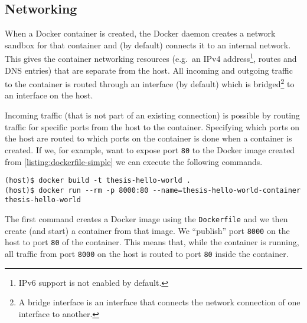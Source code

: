 \subsection{Networking}
When a Docker container is created, the Docker daemon creates a network sandbox for that container and (by default) connects it to an internal network. This gives the container networking resources (e.g.\ an IPv4 address\footnote{IPv6 support is not enabled by default.}, routes and DNS entries) that are separate from the host. All incoming and outgoing traffic to the container is routed through an interface (by default) which is bridged\footnote{A bridge interface is an interface that connects the network connection of one interface to another.} to an interface on the host.

\medskip

Incoming traffic (that is not part of an existing connection) is possible by routing traffic for specific ports from the host to the container.
Specifying which ports on the host are routed to which ports on the container is done when a container is created. If we, for example, want to expose port \lstinline{80} to the Docker image created from \autoref{listing:dockerfile-simple} we can execute the following commands.

\begin{lstlisting}[caption={Creating a Docker container with exposed port.},label={listing:docker-port},captionpos=b]
(host)$ docker build -t thesis-hello-world .
(host)$ docker run --rm -p 8000:80 --name=thesis-hello-world-container thesis-hello-world
\end{lstlisting}

The first command creates a Docker image using the \lstinline{Dockerfile} and we then create (and start) a container from that image. We ``publish'' port \lstinline{8000} on the host to port \lstinline{80} of the container. This means that, while the container is running, all traffic from port \lstinline{8000} on the host is routed to port \lstinline{80} inside the container.
